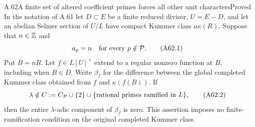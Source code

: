 \begin{statement}{A.62}{A finite set of altered coefficient primes forces all other unit characters}{Proved}
In the notation of A.61 let $D\subset E$ be a finite reduced
divisor, $U=E-D$, and let an abelian Selmer section of $U/L$ have
compact Kummer class $a\kappa(R)$. Suppose that $n\in\mathbb Z$ and
\[
 a_p=n\quad\hbox{for every }p\notin\mathcal P.
 \tag{A62.1}
\]
Put $B=nR$. Let $f\in L[U]^\times$ extend to a regular nonzero
function at $B$, including when $B\in D$. Write $\beta_f$ for
the difference between the global completed Kummer class obtained
from $f$ and $\kappa(f(B))$. If
\[
 \lambda\notin C:=C_{\mathcal P}\cup\{2\}
       \cup\{\hbox{rational primes ramified in }L\},
 \tag{A62.2}
\]
then the entire $\lambda$-adic component of $\beta_f$ is zero.
This assertion imposes no finite-ramification condition on the
original completed Kummer class.
\end{statement}
